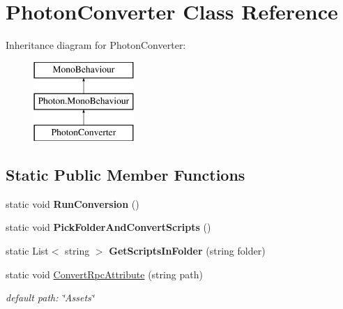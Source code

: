 \hypertarget{class_photon_converter}{}\section{Photon\+Converter Class Reference}
\label{class_photon_converter}
Inheritance diagram for Photon\+Converter\+:\begin{figure}[H]
\begin{center}
\leavevmode
\includegraphics[height=3.000000cm]{class_photon_converter}
\end{center}
\end{figure}
\subsection*{Static Public Member Functions}
\begin{DoxyCompactItemize}
\item 
static void {\bfseries Run\+Conversion} ()\hypertarget{class_photon_converter_a8a0e3279c24dc99ad0a9df0be399435c}{}\label{class_photon_converter_a8a0e3279c24dc99ad0a9df0be399435c}

\item 
static void {\bfseries Pick\+Folder\+And\+Convert\+Scripts} ()\hypertarget{class_photon_converter_a3b9363b3c448859af838fff7beadaf70}{}\label{class_photon_converter_a3b9363b3c448859af838fff7beadaf70}

\item 
static List$<$ string $>$ {\bfseries Get\+Scripts\+In\+Folder} (string folder)\hypertarget{class_photon_converter_a9069c79e964ac9111fe159fb46767b39}{}\label{class_photon_converter_a9069c79e964ac9111fe159fb46767b39}

\item 
static void \hyperlink{class_photon_converter_a5427c432ad183ce9d698a8084e7d8543}{Convert\+Rpc\+Attribute} (string path)\hypertarget{class_photon_converter_a5427c432ad183ce9d698a8084e7d8543}{}\label{class_photon_converter_a5427c432ad183ce9d698a8084e7d8543}

\begin{DoxyCompactList}\small\item\em default path\+: \char`\"{}\+Assets\char`\"{} \end{DoxyCompactList}\end{DoxyCompactItemize}
